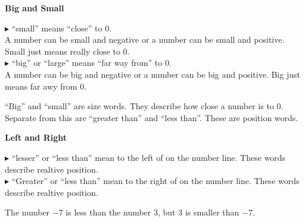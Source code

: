 \documentclass{ximera}
\begin{document}
\newpage

\begin{idea} \textbf{\textcolor{blue!55!black}{Big and Small}} 

\textbf{\textcolor{blue!55!black}{$\blacktriangleright$}}  ``small'' means ``close'' to $0$. \\


A number can be small and negative or a number can be small and positive. Small just means really close to $0$. \\


\textbf{\textcolor{blue!55!black}{$\blacktriangleright$}}  ``big'' or ``large'' means ``far way from'' to $0$. \\


A number can be big and negative or a number can be big and positive. Big just means far awy from $0$. \\


\end{idea}


``Big'' and ``small'' are size words.  They describe how close a number is to $0$. \\

Separate from this are ``greater than'' and ``less than''.  These are position words. \\

\begin{idea} \textbf{\textcolor{blue!55!black}{Left and Right}} 


\textbf{\textcolor{blue!55!black}{$\blacktriangleright$}} ``lesser'' or ``less than'' mean to the left of on the number line. These words describe realtive position.\\


\textbf{\textcolor{blue!55!black}{$\blacktriangleright$}} ``Greater'' or ``less than'' mean to the right of on the number line. These words describe realtive position.\\




\end{idea}








\begin{example}


The number $-7$ is less than the number $3$, but $3$ is smaller than $-7$.



\end{example}
\end{document}

